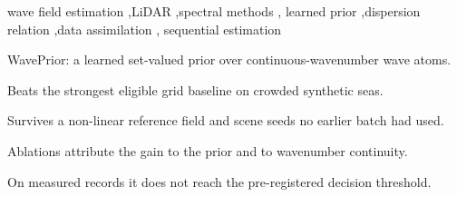 \documentclass[review]{elsarticle}
\begin{document}
\begin{frontmatter}
\begin{abstract}
the coarser grid rung is a direction rather than a size because that arm has no skill.
The gains are synthetic; the grid-baseline comparison is crowded-stratum only, and
in the sparse stratum the evidence is split --- the ablation reproduces there
(\BNineteenBetter{}/\BNineteenN{}; comparator \BNineteenCmpZero{}/\BNineteenN{} against
a zero field) while the learned package is not separated from
the deployed analytic package. The checkpoint was trained on the same distribution
family, so ``out of sample'' means the seed axis alone; and on $12$ measured
fixed-station records the prior does not reach the pre-registered decision threshold
against a per-record zero-field reference.
On a third party's synthetic fields it does not reach that threshold either; there a
dispersion-preserving relabelling of the coordinates --- a thought experiment about
units, not a deployable configuration --- attributes the failure to the estimator's
absolute-scale design range rather than to the information in the returns.
\end{abstract}

\begin{keyword}
wave field estimation \sep LiDAR \sep spectral methods \sep
learned prior \sep dispersion relation \sep data assimilation \sep
sequential estimation
\end{keyword}

\begin{highlights}
\item WavePrior: a learned set-valued prior over continuous-wavenumber wave atoms.
\item Beats the strongest eligible grid baseline on crowded synthetic seas.
\item Survives a non-linear reference field and scene seeds no earlier batch had used.
\item Ablations attribute the gain to the prior and to wavenumber continuity.
\item On measured records it does not reach the pre-registered decision threshold.
\end{highlights}

\end{frontmatter}
\end{document}
